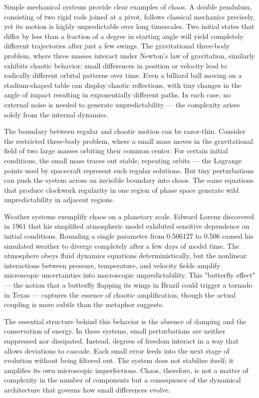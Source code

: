 Simple mechanical systems provide clear examples of chaos. A double pendulum, consisting of two rigid rods joined at a pivot, follows classical mechanics precisely, yet its motion is highly unpredictable over long timescales. Two initial states that differ by less than a fraction of a degree in starting angle will yield completely different trajectories after just a few swings. The gravitational three-body problem, where three masses interact under Newton's law of gravitation, similarly exhibits chaotic behavior: small differences in position or velocity lead to radically different orbital patterns over time. Even a billiard ball moving on a stadium-shaped table can display chaotic reflections, with tiny changes in the angle of impact resulting in exponentially different paths. In each case, no external noise is needed to generate unpredictability — the complexity arises solely from the internal dynamics.

The boundary between regular and chaotic motion can be razor-thin. Consider the restricted three-body problem, where a small mass moves in the gravitational field of two large masses orbiting their common center. For certain initial conditions, the small mass traces out stable, repeating orbits — the Lagrange points used by spacecraft represent such regular solutions. But tiny perturbations can push the system across an invisible boundary into chaos. The same equations that produce clockwork regularity in one region of phase space generate wild unpredictability in adjacent regions.

Weather systems exemplify chaos on a planetary scale. Edward Lorenz discovered in 1961 that his simplified atmospheric model exhibited sensitive dependence on initial conditions. Rounding a single parameter from 0.506127 to 0.506 caused his simulated weather to diverge completely after a few days of model time. The atmosphere obeys fluid dynamics equations deterministically, but the nonlinear interactions between pressure, temperature, and velocity fields amplify microscopic uncertainties into macroscopic unpredictability. This "butterfly effect" — the notion that a butterfly flapping its wings in Brazil could trigger a tornado in Texas — captures the essence of chaotic amplification, though the actual coupling is more subtle than the metaphor suggests.

The essential structure behind this behavior is the absence of damping and the conservation of energy. In these systems, small perturbations are neither suppressed nor dissipated. Instead, degrees of freedom interact in a way that allows deviations to cascade. Each small error feeds into the next stage of evolution without being filtered out. The system does not stabilize itself; it amplifies its own microscopic imperfections. Chaos, therefore, is not a matter of complexity in the number of components but a consequence of the dynamical architecture that governs how small differences evolve.


